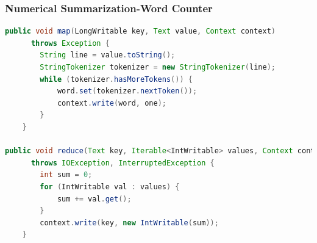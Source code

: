 \documentclass[xcolor=dvipsnames,dvip,notes=show,table]{beamer}
\begin{document}
\begin{frame}[fragile]
  \frametitle{Numerical Summarization-Word Counter}

\begin{lstlisting}[language=Java]
public void map(LongWritable key, Text value, Context context) 
      throws Exception {
        String line = value.toString();
        StringTokenizer tokenizer = new StringTokenizer(line);
        while (tokenizer.hasMoreTokens()) {
            word.set(tokenizer.nextToken());
            context.write(word, one);
        }
    }
    
public void reduce(Text key, Iterable<IntWritable> values, Context context) 
      throws IOException, InterruptedException {
        int sum = 0;
        for (IntWritable val : values) {
            sum += val.get();
        }
        context.write(key, new IntWritable(sum));
    }    
\end{lstlisting}

\end{frame}



\end{document}
